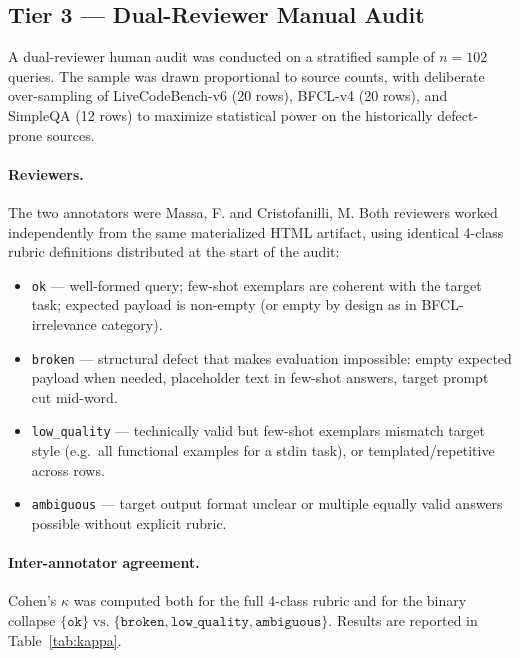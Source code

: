 \documentclass[11pt,a4paper]{article}
\begin{document}
\subsection{Tier 3 — Dual-Reviewer Manual Audit}

A dual-reviewer human audit was conducted on a stratified sample of $n=102$ queries. The sample was drawn proportional to source counts, with deliberate over-sampling of LiveCodeBench-v6 (20 rows), BFCL-v4 (20 rows), and SimpleQA (12 rows) to maximize statistical power on the historically defect-prone sources.

\paragraph{Reviewers.} The two annotators were Massa, F. and Cristofanilli, M. Both reviewers worked independently from the same materialized HTML artifact, using identical 4-class rubric definitions distributed at the start of the audit:

\begin{itemize}[leftmargin=*]
  \item \texttt{ok} — well-formed query; few-shot exemplars are coherent with the target task; expected payload is non-empty (or empty by design as in BFCL-irrelevance category).
  \item \texttt{broken} — structural defect that makes evaluation impossible: empty expected payload when needed, placeholder text in few-shot answers, target prompt cut mid-word.
  \item \texttt{low\_quality} — technically valid but few-shot exemplars mismatch target style (e.g.\ all functional examples for a stdin task), or templated/repetitive across rows.
  \item \texttt{ambiguous} — target output format unclear or multiple equally valid answers possible without explicit rubric.
\end{itemize}

\paragraph{Inter-annotator agreement.} Cohen's $\kappa$ was computed both for the full 4-class rubric and for the binary collapse $\{\texttt{ok}\} \mathrel{\text{vs.}} \{\texttt{broken},\texttt{low\_quality},\texttt{ambiguous}\}$. Results are reported in Table~\ref{tab:kappa}.
\end{document}
